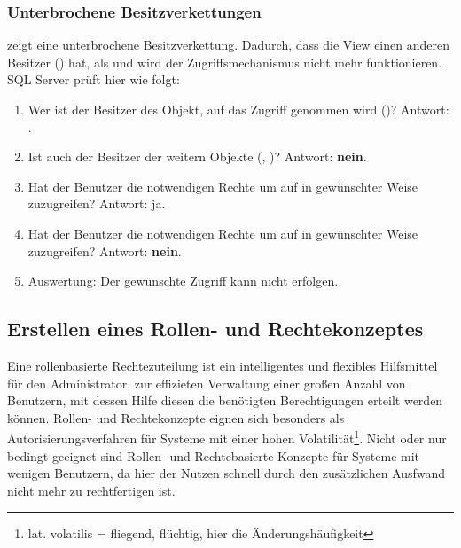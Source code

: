         \subsubsection{Unterbrochene Besitzverkettungen}
           zeigt eine unterbrochene
          Besitzverkettung. Dadurch, dass die View
           einen anderen Besitzer
          () hat, als
           und 
          wird der Zugriffsmechanismus nicht mehr funktionieren. SQL Server
          prüft hier wie folgt:
          \begin{enumerate}
            \item Wer ist der Besitzer des Objekt, auf das Zugriff genommen
            wird ()? Antwort:
            .
            \item Ist  auch der Besitzer der weitern Objekte
            (, )?
            Antwort: \textbf{nein}.
            \item Hat der Benutzer  die notwendigen Rechte um
            auf  in gewünschter Weise
            zuzugreifen? Antwort: ja.
            \item Hat der Benutzer  die notwendigen Rechte um
            auf  in gewünschter Weise
            zuzugreifen? Antwort: \textbf{nein}.
            \item Auswertung: Der gewünschte Zugriff kann nicht erfolgen.
          \end{enumerate}
          \begin{literaturinternet}
            \item \cite{ms188676}
            \item \cite{bb669084}
          \end{literaturinternet}
      \subsection{Erstellen eines Rollen- und Rechtekonzeptes}
        Eine rollenbasierte Rechtezuteilung ist ein intelligentes und flexibles
        Hilfsmittel für den Administrator, zur effizieten Verwaltung einer
        großen Anzahl von Benutzern, mit dessen Hilfe diesen die benötigten
        Berechtigungen erteilt werden können. Rollen- und Rechtekonzepte eignen
        sich besonders als Autorisierungsverfahren für Systeme mit einer hohen
        Volatilität\footnote{lat. volatilis = fliegend, flüchtig, hier die
        Änderungshäufigkeit}. Nicht oder nur bedingt geeignet sind Rollen- und
        Rechtebasierte Konzepte für Systeme mit wenigen Benutzern, da hier der
        Nutzen schnell durch den zusätzlichen Ausfwand nicht mehr zu
        rechtfertigen ist.
